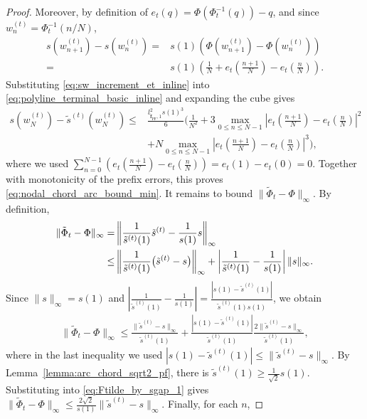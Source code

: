 \documentclass{article}
\newcommand{\f}{\mathbf{f}}
\newcommand{\Farc}{\Phi}
\begin{document}
\begin{proof}
Moreover, by definition of $e_t(q)=\Farc(\Farc_t^{-1}(q))-q$, and since
$w_n^{(t)}=\Farc_t^{-1}(n/N)$,
\begin{align}
s(w_{n+1}^{(t)})-s(w_n^{(t)})
= &
s(1)\left(\Farc(w_{n+1}^{(t)})-\Farc(w_n^{(t)})\right)
\nonumber\\
= &
s(1)\left(
\frac1N
+
e_t\left(\frac{n+1}{N}\right)
-
e_t\left(\frac{n}{N}\right)
\right).
\label{eq:sw_increment_et_inline}
\end{align}
Substituting \eqref{eq:sw_increment_et_inline} into
\eqref{eq:polyline_terminal_basic_inline} and expanding the cube gives
\begin{align}
s(w_N^{(t)})-\tilde s^{(t)}(w_N^{(t)})
\le&
\frac{l_{\tilde{\f}_{\mathrm{PF}},1}^2 s(1)^3}{6}
\Bigg(
\frac1{N^2}
+
3 \max_{0\le n\le N-1}
\left|e_t\left(\tfrac{n+1}{N}\right)-e_t\left(\tfrac{n}{N}\right)\right|^2
\nonumber\\
&
+
N \max_{0\le n\le N-1}
\left|e_t\left(\tfrac{n+1}{N}\right)-e_t\left(\tfrac{n}{N}\right)\right|^3
\Bigg),
\label{eq:polyline_after_cancel_inline}
\end{align}
where we used
$
\sum_{n=0}^{N-1}
\left(
e_t\left(\tfrac{n+1}{N}\right)-e_t\left(\tfrac{n}{N}\right)
\right)
=
e_t(1)-e_t(0)=0.
$
Together with monotonicity of the prefix errors, this proves
\eqref{eq:nodal_chord_arc_bound_min}. It remains to bound $\|\tilde \Farc_t-\Farc\|_\infty$.
By definition,
\begin{align}
\|\tilde \Farc_t-\Farc\|_\infty = & \left\| \frac{1}{\tilde s^{(t)}(1)} \tilde s^{(t)} - \frac{1}{s(1)} s \right\|_\infty \notag\\
\leq & \left\| \frac{1}{\tilde s^{(t)}(1)}\bigl(\tilde s^{(t)}-s\bigr) \right\|_\infty + \left| \frac{1}{\tilde s^{(t)}(1)}-\frac{1}{s(1)} \right| \|s\|_\infty. \label{eq:Ftilde_split}
\end{align}
Since $\|s\|_\infty=s(1)$ and $\left|
\frac{1}{\tilde s^{(t)}(1)}-\frac{1}{s(1)} \right| = \frac{|s(1)-\tilde s^{(t)}(1)|}{\tilde s^{(t)}(1)s(1)}$, we obtain
\begin{align}
\|\tilde \Farc_t-\Farc\|_\infty \le \frac{\|\tilde s^{(t)}-s\|_\infty}{\tilde s^{(t)}(1)} + \frac{|s(1)-\tilde s^{(t)}(1)|}{\tilde s^{(t)}(1)} \frac{2\|\tilde s^{(t)}-s\|_\infty}{\tilde s^{(t)}(1)}, \label{eq:Ftilde_by_sgap_1} \end{align}
where in the last inequality we used $|s(1)-\tilde s^{(t)}(1)| \le \|\tilde s^{(t)}-s\|_\infty$. By Lemma~\ref{lemma:arc_chord_sqrt2_pf}, there is $\tilde s^{(t)}(1)\ge \frac{1}{\sqrt2}s(1)$. Substituting into \eqref{eq:Ftilde_by_sgap_1} gives $\|\tilde \Farc_t-\Farc\|_\infty \le \frac{2\sqrt2}{s(1)}\|\tilde s^{(t)}-s\|_\infty$. Finally, for each $n$,

\end{proof}
\end{document}
